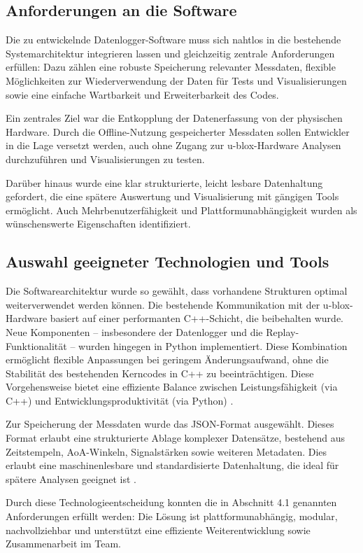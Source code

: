 \documentclass[a4paper, 12pt]{article} %
\begin{document}
\subsection{Anforderungen an die Software}
Die zu entwickelnde Datenlogger-Software muss sich nahtlos in die bestehende Systemarchitektur integrieren lassen und gleichzeitig zentrale 
Anforderungen erfüllen: Dazu zählen eine robuste Speicherung relevanter Messdaten, flexible Möglichkeiten zur Wiederverwendung der Daten für 
Tests und Visualisierungen sowie eine einfache Wartbarkeit und Erweiterbarkeit des Codes.

Ein zentrales Ziel war die Entkopplung der Datenerfassung von der physischen Hardware. Durch die Offline-Nutzung gespeicherter Messdaten 
sollen Entwickler in die Lage versetzt werden, auch ohne Zugang zur u-blox-Hardware Analysen durchzuführen und Visualisierungen zu testen.

Darüber hinaus wurde eine klar strukturierte, leicht lesbare Datenhaltung gefordert, die eine spätere Auswertung und Visualisierung mit
gängigen Tools ermöglicht. Auch Mehrbenutzerfähigkeit und Plattformunabhängigkeit wurden als wünschenswerte Eigenschaften identifiziert.

\subsection{Auswahl geeigneter Technologien und Tools}
Die Softwarearchitektur wurde so gewählt, dass vorhandene Strukturen optimal weiterverwendet werden können. Die bestehende Kommunikation mit der 
u-blox-Hardware basiert auf einer performanten C++-Schicht, die beibehalten wurde. Neue Komponenten – insbesondere der Datenlogger und die Replay-Funktionalität – wurden hingegen in Python implementiert. Diese Kombination ermöglicht flexible Anpassungen bei geringem Änderungsaufwand, ohne die Stabilität des bestehenden Kerncodes in C++ zu beeinträchtigen. Diese Vorgehensweise bietet eine effiziente Balance zwischen Leistungsfähigkeit (via C++) und Entwicklungsproduktivität (via Python) \cite{cpp_python_integration}.

Zur Speicherung der Messdaten wurde das \ac{JSON}-Format ausgewählt. Dieses Format erlaubt eine strukturierte Ablage komplexer Datensätze, bestehend aus Zeitstempeln, \ac{AoA}-Winkeln, Signalstärken sowie weiteren Metadaten. Dies erlaubt eine maschinenlesbare und standardisierte Datenhaltung, die ideal für spätere Analysen geeignet ist \cite{json_logging_bestpractices}.

Durch diese Technologieentscheidung konnten die in Abschnitt 4.1 genannten Anforderungen erfüllt werden: Die Lösung ist plattformunabhängig,
 modular, nachvollziehbar und unterstützt eine effiziente Weiterentwicklung sowie Zusammenarbeit im Team.
\end{document}
